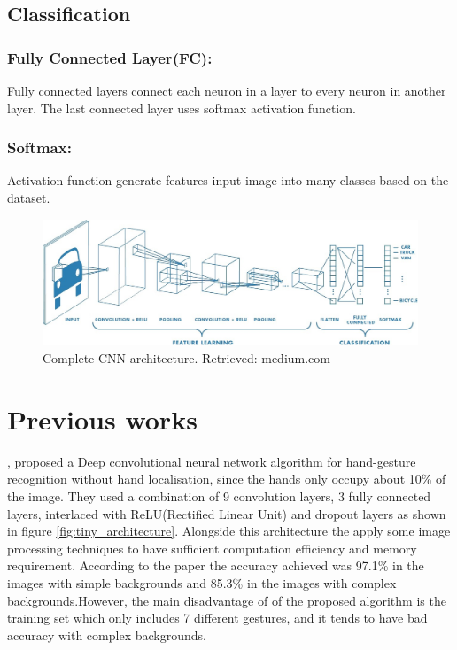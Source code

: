 \documentclass[12pt]{report}
\begin{document}
    \subsection{Classification}
        \subsubsection{Fully Connected Layer(FC):}
            Fully connected layers connect each neuron in a layer to every neuron in another layer.
            The last connected layer uses softmax activation function.
        \subsubsection{Softmax:}
            Activation function generate features input image into many classes based on the dataset.  
        
        \bigbreak
        \bigbreak
        

            \begin{figure} [h]
                \centering
                \includegraphics[width=\textwidth]{./images/c_cnn.jpeg}

                \caption{Complete CNN architecture. Retrieved: medium.com}
                \label{fig:c_cnn}
            \end{figure}



\section{Previous works}

\cite{Bao2017}, proposed a Deep convolutional neural network algorithm for hand-gesture 
recognition without hand localisation, since the hands only occupy about 10\% of 
the image. They used a combination of 9 convolution layers, 3 fully connected layers, 
interlaced with ReLU(Rectified Linear Unit) and dropout layers as shown in 
figure \ref{fig:tiny_architecture}. Alongside this architecture the apply some image 
processing techniques to have sufficient computation efficiency and memory requirement.
According to the paper the accuracy achieved was 97.1\% in the images with simple backgrounds
and 85.3\% in the images with complex backgrounds.However, the main disadvantage of of 
the proposed algorithm is the training set which only includes 7 different gestures,
and it tends to have bad accuracy with complex backgrounds.
\bigbreak
\end{document}
